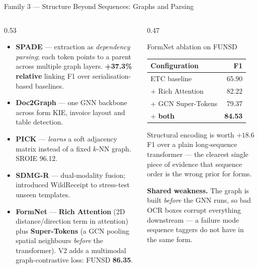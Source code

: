 \documentclass[aspectratio=169, 11pt]{beamer}
\renewcommand{\arraystretch}{1.15}
\newcommand{\gap}[1]{{\color{warn}\textbf{#1}}}
\begin{document}
\begin{frame}{Family 3 — Structure Beyond Sequences: Graphs and Parsing}
\begin{columns}[T]
\begin{column}{0.53\textwidth}
      {\setlength{\itemsep}{1pt}\setlength{\topsep}{1pt}\setlength{\parsep}{0pt}
      \begin{itemize}\footnotesize
        \item \textbf{SPADE} — extraction as \emph{dependency parsing}; each token points to a parent across multiple graph layers. \gap{+37.3\% relative} linking F1 over serialisation-based baselines.
        \item \textbf{Doc2Graph} — one GNN backbone across form KIE, invoice layout and table detection.
        \item \textbf{PICK} — \emph{learns} a soft adjacency matrix instead of a fixed $k$-NN graph. SROIE 96.12.
        \item \textbf{SDMG-R} — dual-modality fusion; introduced WildReceipt to stress-test unseen templates.
        \item \textbf{FormNet} — \textbf{Rich Attention} (2D distance/direction term in attention) plus \textbf{Super-Tokens} (a GCN pooling spatial neighbours \emph{before} the transformer). V2 adds a multimodal graph-contrastive loss: FUNSD \textbf{86.35}.
      \end{itemize}}
    \end{column}
    \begin{column}{0.47\textwidth}
      \begin{block}{FormNet ablation on FUNSD}
        \small
        {\renewcommand{\arraystretch}{1.0}
        \begin{tabular}{@{}lr@{}}
          \toprule
          Configuration & F1 \\
          \midrule
          ETC baseline & 65.90 \\
          \quad + Rich Attention & 82.22 \\
          \quad + GCN Super-Tokens & 79.37 \\
          \quad + \textbf{both} & \textbf{84.53} \\
          \bottomrule
        \end{tabular}}
      \end{block}
      \vspace{2pt}
      {\footnotesize\color{muted} Structural encoding is worth $+18.6$ F1 over a plain long-sequence transformer — the clearest single piece of evidence that sequence order is the wrong prior for forms.}
      \vspace{2pt}

      {\scriptsize\color{warn}\textbf{Shared weakness.} The graph is built \emph{before} the GNN runs, so bad OCR boxes corrupt everything downstream — a failure mode sequence taggers do not have in the same form.}
    \end{column}
  \end{columns}
\end{frame}
\end{document}
